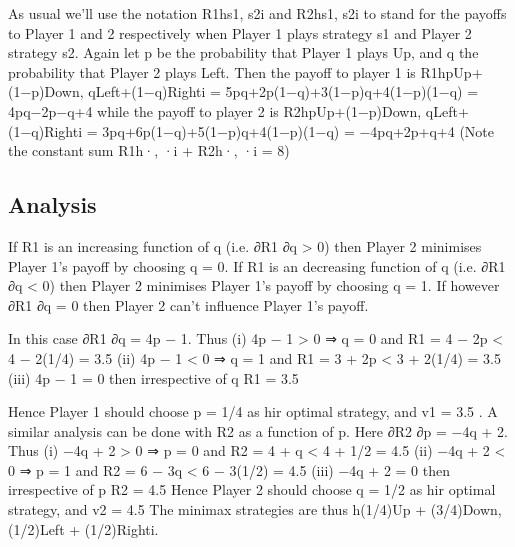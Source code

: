\documentclass{article}
\begin{document}
As usual we’ll use the notation R1hs1, s2i and R2hs1, s2i to stand for the payoffs to Player
1 and 2 respectively when Player 1 plays strategy s1 and Player 2 strategy s2. Again let p
be the probability that Player 1 plays Up, and q the probability that Player 2 plays Left.
Then the payoff to player 1 is
R1hpUp+(1−p)Down, qLeft+(1−q)Righti = 5pq+2p(1−q)+3(1−p)q+4(1−p)(1−q) = 4pq−2p−q+4
while the payoff to player 2 is
R2hpUp+(1−p)Down, qLeft+(1−q)Righti = 3pq+6p(1−q)+5(1−p)q+4(1−p)(1−q) = −4pq+2p+q+4
(Note the constant sum R1h·, ·i + R2h·, ·i = 8)

\subsection{Analysis}
If R1 is an increasing function of q (i.e. ∂R1
∂q > 0) then Player 2 minimises Player 1’s
payoff by choosing q = 0. If R1 is an decreasing function of q (i.e. ∂R1
∂q < 0) then Player
2 minimises Player 1’s payoff by choosing q = 1. If however ∂R1
∂q = 0 then Player 2 can’t
influence Player 1’s payoff.

In this case ∂R1
∂q = 4p − 1. Thus
(i) 4p − 1 > 0 ⇒ q = 0 and
R1 = 4 − 2p < 4 − 2(1/4) = 3.5
(ii) 4p − 1 < 0 ⇒ q = 1 and
R1 = 3 + 2p < 3 + 2(1/4) = 3.5
(iii) 4p − 1 = 0 then irrespective of q
R1 = 3.5


Hence Player 1 should choose p = 1/4 as hir optimal strategy, and v1 = 3.5 .
A similar analysis can be done with R2 as a function of p. Here ∂R2
∂p = −4q + 2. Thus
(i) −4q + 2 > 0 ⇒ p = 0 and
R2 = 4 + q < 4 + 1/2 = 4.5
(ii) −4q + 2 < 0 ⇒ p = 1 and
R2 = 6 − 3q < 6 − 3(1/2) = 4.5
(iii) −4q + 2 = 0 then irrespective of p
R2 = 4.5
Hence Player 2 should choose q = 1/2 as hir optimal strategy, and v2 = 4.5
The minimax strategies are thus h(1/4)Up + (3/4)Down,(1/2)Left + (1/2)Righti.
\end{document}
